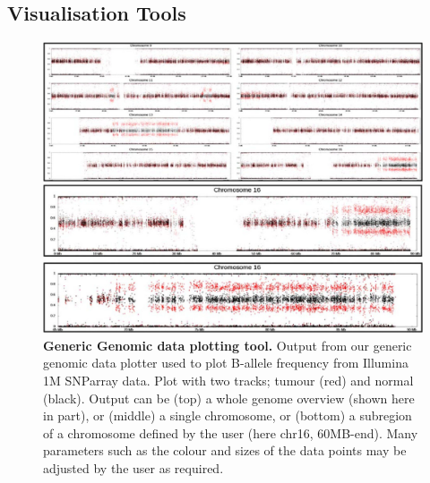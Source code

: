 \subsection*{Visualisation Tools}

\begin{figure}[t!]
\centering
\includegraphics[scale=1.5]{chapters/images/cgtag/fig1-plotter.png}
\caption{\textbf{Generic Genomic data plotting tool.} Output from our generic genomic data plotter used to plot B-allele frequency from Illumina 1M SNParray data. Plot with two tracks; tumour (red) and normal (black). Output can be (top) a whole genome overview (shown here in part), or (middle) a single chromosome, or (bottom) a subregion of a chromosome defined by the user (here chr16, 60MB-end). Many parameters such as the colour and sizes of the data points may be adjusted by the user as required.}\label{fig:plotter}
\end{figure}


